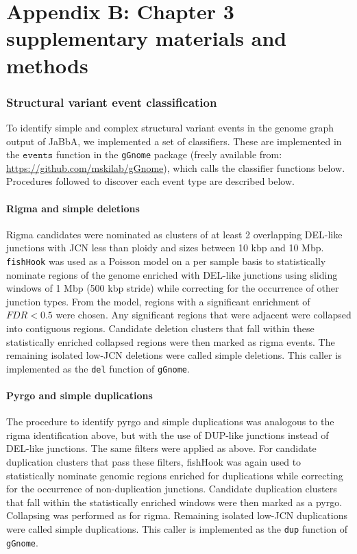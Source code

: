 \documentclass[phd,tocprelim]{cornell}
\newcommand{\ttt}[1]{\texttt{#1}}
\begin{document}
\chapter*{Appendix B: Chapter 3 supplementary materials and methods} \label{app:b}

\subsection*{Structural variant event classification}
To identify simple and complex structural variant events in the genome graph output of JaBbA, we implemented a set of classifiers.  These are implemented in the $\ttt{events}$ function in the \texttt{gGnome} package (freely available from: \url{https://github.com/mskilab/gGnome}), which calls the classifier functions below. Procedures followed to discover each event type are described below.

\subsubsection*{Rigma and simple deletions}
Rigma candidates were nominated as clusters of at least 2 overlapping DEL-like junctions with JCN less than ploidy and sizes between 10 kbp and 10 Mbp. \texttt{fishHook} was used as a Poisson model on a per sample basis to statistically nominate regions of the genome enriched with DEL-like junctions using sliding windows of 1 Mbp (500 kbp stride) while correcting for the occurrence of other junction types. From the model, regions with a significant enrichment of $FDR < 0.5$ were chosen. Any significant regions that were adjacent were collapsed into contiguous regions. Candidate deletion clusters that fall within these statistically enriched collapsed regions were then marked as rigma events. The remaining isolated low-JCN deletions were called simple deletions.  This caller is implemented as the \ttt{del} function of \ttt{gGnome}.

\subsubsection*{Pyrgo and simple duplications}
The procedure to identify pyrgo and simple duplications was analogous to the rigma identification above, but with the use of DUP-like junctions instead of DEL-like junctions. The same filters were applied as above. For candidate duplication clusters that pass these filters, fishHook was again used to statistically nominate genomic regions enriched for duplications while correcting for the occurrence of non-duplication junctions. Candidate duplication clusters that fall within the statistically enriched windows were then marked as a pyrgo. Collapsing was performed as for rigma. Remaining isolated low-JCN duplications were called simple duplications. This caller is implemented as the \ttt{dup} function of \ttt{gGnome}.
\end{document}
